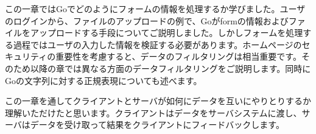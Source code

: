 この一章ではGoでどのようにフォームの情報を処理するか学びました。ユーザのログインから、ファイルのアップロードの例で、Goがformの情報およびファイルをアップロードする手段についてご説明しました。しかしフォームを処理する過程ではユーザの入力した情報を検証する必要があります。ホームページのセキュリティの重要性を考慮すると、データのフィルタリングは相当重要です。そのため以降の章では異なる方面のデータフィルタリングをご説明します。同時にGoの文字列に対する正規表現についても述べます。

この一章を通してクライアントとサーバが如何にデータを互いにやりとりするか理解いただけたと思います。クライアントはデータをサーバシステムに渡し、サーバはデータを受け取って結果をクライアントにフィードバックします。
